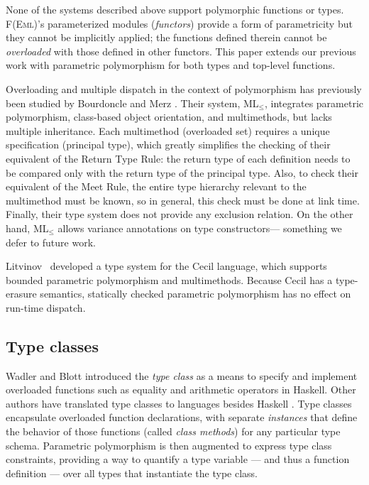 \documentclass[10pt]{sigplanconf}
\begin{document}
None of the systems described above support polymorphic functions or types. 
F(E\textsc{ml})'s parameterized modules (\emph{functors}) 
provide a form of parametricity 
but they cannot be implicitly applied; 
the functions defined therein cannot be \emph{overloaded} 
with those defined in other functors.
This paper extends our previous work \cite{allen07} 
with parametric polymorphism for both types and top-level functions.

Overloading and multiple dispatch in the context of polymorphism 
has previously been studied by Bourdoncle and Merz \cite{bourdoncle97}. 
Their system, ML$_\le$, integrates parametric polymorphism, 
class-based object orientation, and multimethods,
but lacks multiple inheritance.
Each multimethod (overloaded set) requires a unique specification (principal type), 
which greatly simplifies the checking of their equivalent of the Return Type Rule: 
the return type of each definition needs to be compared 
only with the return type of the principal type.
Also, 
to check their equivalent of the Meet Rule, 
the entire type hierarchy relevant to the multimethod must be known, 
so in general, this check must be done at link time.
Finally, 
their type system does not provide any exclusion relation.
On the other hand, ML$_\le$ allows variance annotations on type constructors---%
something we defer to future work.

Litvinov~\cite{litvinov98} developed a type system for the Cecil language,
which supports bounded parametric polymorphism and multimethods.
Because Cecil has a type-erasure semantics, 
statically checked parametric polymorphism has no effect on run-time dispatch.

\subsection{Type classes} Wadler and Blott \cite{wadler89} introduced the
\emph{type class} as a means to specify and implement overloaded
functions such as equality and arithmetic operators in Haskell. Other authors
have translated type classes to languages besides Haskell \cite{dreyer07,siek05,wehr07}.
Type classes encapsulate overloaded function declarations, with separate
\emph{instances} that define the behavior of those functions (called \emph{class methods})
for any particular type schema. Parametric polymorphism is then augmented to
express type class constraints, providing a way to quantify a type variable --- and
thus a function definition --- over all types that instantiate the type class. 
\end{document}
